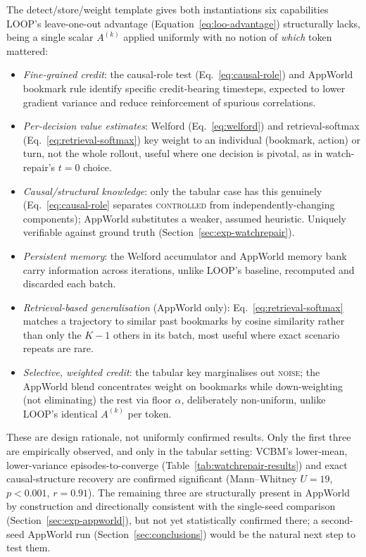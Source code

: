 The detect/store/weight template gives both instantiations six capabilities LOOP's leave-one-out advantage (Equation~\ref{eq:loo-advantage}) structurally lacks, being a single scalar $A^{(k)}$ applied uniformly with no notion of \emph{which} token mattered:
\begin{itemize}[itemsep=0pt,topsep=2pt,parsep=0pt,partopsep=0pt]
  \item \emph{Fine-grained credit}: the causal-role test (Eq.~\ref{eq:causal-role}) and AppWorld bookmark rule identify specific credit-bearing timesteps, expected to lower gradient variance and reduce reinforcement of spurious correlations.
  \item \emph{Per-decision value estimates}: Welford (Eq.~\ref{eq:welford}) and retrieval-softmax (Eq.~\ref{eq:retrieval-softmax}) key weight to an individual (bookmark, action) or turn, not the whole rollout, useful where one decision is pivotal, as in watch-repair's $t{=}0$ choice.
  \item \emph{Causal/structural knowledge}: only the tabular case has this genuinely (Eq.~\ref{eq:causal-role} separates \textsc{controlled} from independently-changing components); AppWorld substitutes a weaker, assumed heuristic. Uniquely verifiable against ground truth (Section~\ref{sec:exp-watchrepair}).
  \item \emph{Persistent memory}: the Welford accumulator and AppWorld memory bank carry information across iterations, unlike LOOP's baseline, recomputed and discarded each batch.
  \item \emph{Retrieval-based generalisation} (AppWorld only): Eq.~\ref{eq:retrieval-softmax} matches a trajectory to similar past bookmarks by cosine similarity rather than only the $K-1$ others in its batch, most useful where exact scenario repeats are rare.
  \item \emph{Selective, weighted credit}: the tabular key marginalises out \textsc{noise}; the AppWorld blend concentrates weight on bookmarks while down-weighting (not eliminating) the rest via floor $\alpha$, deliberately non-uniform, unlike LOOP's identical $A^{(k)}$ per token.
\end{itemize}
These are design rationale, not uniformly confirmed results. Only the first three are empirically observed, and only in the tabular setting: VCBM's lower-mean, lower-variance episodes-to-converge (Table~\ref{tab:watchrepair-results}) and exact causal-structure recovery are confirmed significant (Mann--Whitney $U=19$, $p<0.001$, $r=0.91$). The remaining three are structurally present in AppWorld by construction and directionally consistent with the single-seed comparison (Section~\ref{sec:exp-appworld}), but not yet statistically confirmed there; a second-seed AppWorld run (Section~\ref{sec:conclusions}) would be the natural next step to test them.

